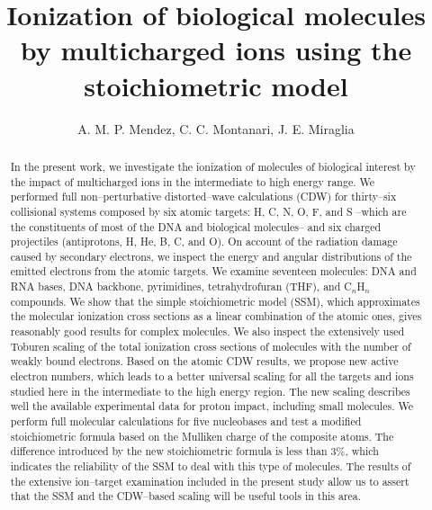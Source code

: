 \documentclass[10pt,showpacs,showkeys,twocolumn]{revtex4}
\begin{document}
\title[Ionization of biological molecules by multicharged 
ions]{Ionization of biological molecules by multicharged ions using 
the stoichiometric model}
\author{A. M. P. Mendez, C. C. Montanari, J. E. Miraglia}


\begin{abstract}
In the present work, we investigate the ionization of molecules of 
biological interest by the impact of multicharged ions in the 
intermediate to high energy range. We performed full non--perturbative 
distorted--wave calculations (CDW) for thirty--six collisional systems 
composed by six atomic targets: H, C, N, O, F, and S --which are the 
constituents of most of the DNA and biological molecules-- and six 
charged projectiles (antiprotons, H, He, B, C, and O). On account of 
the radiation damage caused by secondary electrons, we inspect the 
energy and angular distributions of the emitted electrons from the 
atomic targets. We examine seventeen molecules: DNA and RNA bases, 
DNA backbone, pyrimidines, tetrahydrofuran (THF), and C$_n$H$_n$ 
compounds. We show that the simple stoichiometric model (SSM), which 
approximates the molecular ionization cross sections as a linear 
combination of the atomic ones, gives reasonably good results for 
complex molecules. We also inspect the extensively used Toburen scaling 
of the total ionization cross sections of molecules with the number of 
weakly bound electrons. Based on the atomic CDW results, we 
propose new active electron numbers, which leads to a better universal 
scaling for all the targets and ions studied here in the intermediate 
to the high energy region. The new scaling describes well the available 
experimental data for proton impact, including small molecules. We 
perform full molecular calculations for five nucleobases and test a 
modified stoichiometric formula based on the Mulliken charge of the 
composite atoms. The difference introduced by the new stoichiometric 
formula is less than 3\%, which indicates the reliability of the SSM to 
deal with this type of molecules. The results of the extensive 
ion--target examination included in the present study allow us to assert 
that the SSM and the CDW--based scaling will be useful tools in this area.
\end{abstract}

\end{document}
